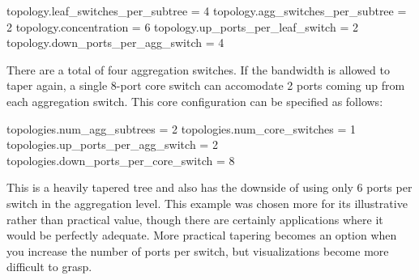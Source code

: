\begin{ViFile}
topology.leaf_switches_per_subtree = 4
topology.agg_switches_per_subtree = 2
topology.concentration = 6
topology.up_ports_per_leaf_switch = 2
topology.down_ports_per_agg_switch = 4
\end{ViFile}

There are a total of four aggregation switches.
If the bandwidth is allowed to taper again, a single 8-port core switch can accomodate 2 ports coming up from each aggregation switch.
This core configuration can be specified as follows:

\begin{ViFile}
topologies.num_agg_subtrees = 2
topologies.num_core_switches = 1
topologies.up_ports_per_agg_switch = 2
topologies.down_ports_per_core_switch = 8
\end{ViFile}

This is a heavily tapered tree and also has the downside of using only 6 ports per switch in the aggregation level.
This example was chosen more for its illustrative rather than practical value, though there are certainly applications where it would be perfectly adequate. 
More practical tapering becomes an option when you increase the number of ports per switch, but visualizations become more difficult to grasp.

